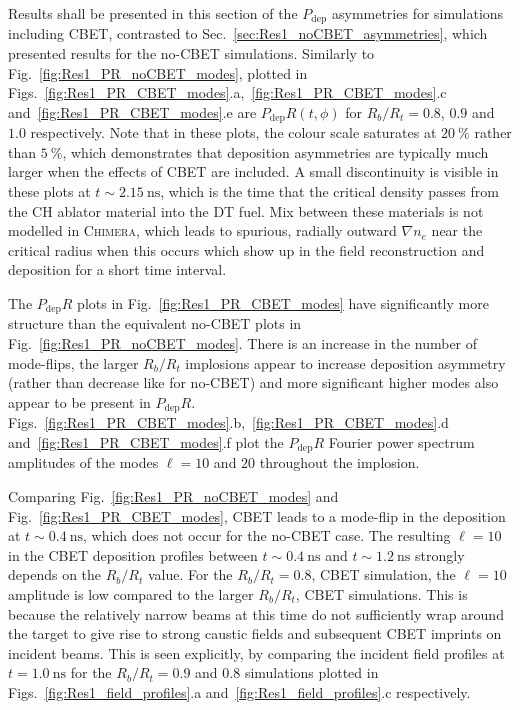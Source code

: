 Results shall be presented in this section of the $P_{\text{dep}}$ asymmetries for simulations including \ac{CBET}, contrasted to Sec.~\ref{sec:Res1_noCBET_asymmetries}, which presented results for the no-\ac{CBET} simulations.
Similarly to Fig.~\ref{fig:Res1_PR_noCBET_modes}, plotted in Figs.~\ref{fig:Res1_PR_CBET_modes}.a,~\ref{fig:Res1_PR_CBET_modes}.c and~\ref{fig:Res1_PR_CBET_modes}.e are $P_{\text{dep}}R(t,\phi)$ for $R_b/R_t=0.8$, $0.9$ and $1.0$ respectively.
Note that in these plots, the colour scale saturates at $20\ \%$ rather than $5\ \%$, which demonstrates that deposition asymmetries are typically much larger when the effects of \ac{CBET} are included.
A small discontinuity is visible in these plots at $t\sim2.15\ \text{ns}$, which is the time that the critical density passes from the CH ablator material into the DT fuel.
Mix between these materials is not modelled in \textsc{Chimera}, which leads to spurious, radially outward $\nabla n_e$ near the critical radius when this occurs which show up in the field reconstruction and deposition for a short time interval.

The $P_{\text{dep}}R$ plots in Fig.~\ref{fig:Res1_PR_CBET_modes} have significantly more structure than the equivalent no-\ac{CBET} plots in Fig.~\ref{fig:Res1_PR_noCBET_modes}.
There is an increase in the number of mode-flips, the larger $R_b/R_t$ implosions appear to increase deposition asymmetry (rather than decrease like for no-\ac{CBET}) and more significant higher modes also appear to be present in $P_{\text{dep}}R$.
Figs.~\ref{fig:Res1_PR_CBET_modes}.b,~\ref{fig:Res1_PR_CBET_modes}.d and~\ref{fig:Res1_PR_CBET_modes}.f plot the $P_{\text{dep}}R$ Fourier power spectrum amplitudes of the modes $\ell=10$ and $20$ throughout the implosion.

Comparing Fig.~\ref{fig:Res1_PR_noCBET_modes} and Fig.~\ref{fig:Res1_PR_CBET_modes}, \ac{CBET} leads to a mode-flip in the deposition at $t\sim0.4\ \text{ns}$, which does not occur for the no-\ac{CBET} case.
The resulting $\ell=10$ in the \ac{CBET} deposition profiles between $t\sim0.4\ \text{ns}$ and $t\sim1.2\ \text{ns}$ strongly depends on the $R_b/R_t$ value.
For the $R_b/R_t=0.8$, \ac{CBET} simulation, the $\ell=10$ amplitude is low compared to the larger $R_b/R_t$, \ac{CBET} simulations.
This is because the relatively narrow beams at this time do not sufficiently wrap around the target to give rise to strong caustic fields and subsequent \ac{CBET} imprints on incident beams.
This is seen explicitly, by comparing the incident field profiles at $t=1.0\ \text{ns}$ for the $R_b/R_t=0.9$ and $0.8$ simulations plotted in Figs.~\ref{fig:Res1_field_profiles}.a and~\ref{fig:Res1_field_profiles}.c respectively.

